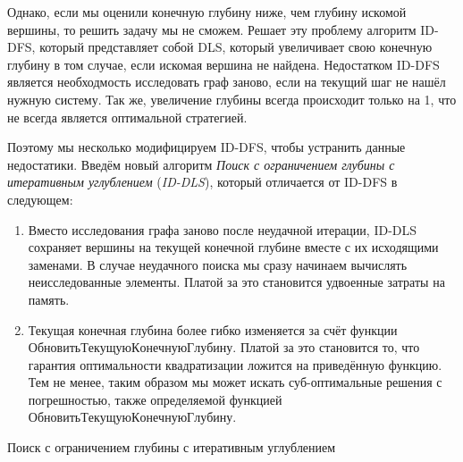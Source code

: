 Однако, если мы оценили конечную глубину ниже, чем глубину искомой вершины, то решить задачу мы не сможем. Решает эту проблему алгоритм ID-DFS, который представляет собой DLS, который увеличивает свою конечную глубину в том случае, если искомая вершина не найдена. Недостатком ID-DFS является необходмость исследовать граф заново, если на текущий шаг не нашёл нужную систему. Так же, увеличение глубины всегда происходит только на 1, что не всегда является оптимальной стратегией.

Поэтому мы несколько модифицируем ID-DFS, чтобы устранить данные недостатики. Введём новый алгоритм \textit{Поиск с ограничением глубины с итеративным углублением} (\textit{ID-DLS}), который отличается от ID-DFS в следующем:

\begin{enumerate}
    \item Вместо исследования графа заново после неудачной итерации, ID-DLS сохраняет вершины на текущей конечной глубине вместе с их исходящими заменами. В случае неудачного поиска мы сразу начинаем вычислять неисследованные элементы. Платой за это становится удвоенные затраты на память.
    \item Текущая конечная глубина более гибко изменяется за счёт функции $ОбновитьТекущуюКонечнуюГлубину$. Платой за это становится то, что гарантия оптимальности квадратизации ложится на приведённую функцию. Тем не менее, таким образом мы может искать суб-оптимальные решения с погрешностью, также определяемой функцией $ОбновитьТекущуюКонечнуюГлубину$.
\end{enumerate}

\begin{algorithm}[H]
\SetAlgoLined
{}

\caption{Поиск с ограничением глубины с итеративным углублением}
\label{algo:ID-DLS}
\end{algorithm}



